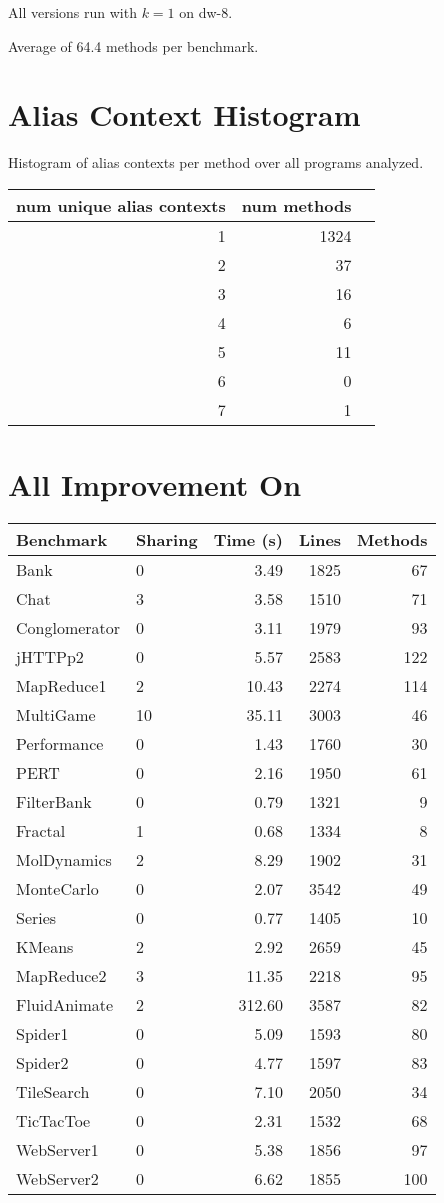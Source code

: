 \documentclass{article}
\begin{document}
All versions run with $k=1$ on dw-8.

Average of 64.4 methods per benchmark.


\section{Alias Context Histogram}
Histogram of alias contexts per method over all programs analyzed.

\begin{tabular}{|r|r|r|}
\hline
num unique alias contexts & num methods \\
\hline
1 & 1324 \\
2 & 37   \\
3 & 16   \\
4 & 6    \\
5 & 11   \\
6 & 0    \\
7 & 1    \\
\hline
\end{tabular}


 
\section{All Improvement On}
\begin{tabular}{|l|l|r|r|r|}
\hline
Benchmark & Sharing & Time (s) & Lines & Methods \\
\hline
Bank & 0 & 3.49 & 1825 & 67 \\
Chat & 3 & 3.58 & 1510 & 71 \\
Conglomerator & 0 & 3.11 & 1979 & 93 \\
jHTTPp2 & 0 & 5.57 & 2583 & 122 \\
MapReduce1 & 2 & 10.43 & 2274 & 114 \\
MultiGame & 10 & 35.11 & 3003 & 46 \\
Performance & 0 & 1.43 & 1760 & 30 \\
PERT & 0 & 2.16 & 1950 & 61 \\
FilterBank & 0 & 0.79 & 1321 & 9 \\
Fractal & 1 & 0.68 & 1334 & 8 \\
MolDynamics & 2 & 8.29 & 1902 & 31 \\
MonteCarlo & 0 & 2.07 & 3542 & 49 \\
Series & 0 & 0.77 & 1405 & 10 \\
KMeans & 2 & 2.92 & 2659 & 45 \\
MapReduce2 & 3 & 11.35 & 2218 & 95 \\
FluidAnimate & 2 & 312.60 & 3587 & 82 \\
Spider1 & 0 & 5.09 & 1593 & 80 \\
Spider2 & 0 & 4.77 & 1597 & 83 \\
TileSearch & 0 & 7.10 & 2050 & 34 \\
TicTacToe & 0 & 2.31 & 1532 & 68 \\
WebServer1 & 0 & 5.38 & 1856 & 97 \\
WebServer2 & 0 & 6.62 & 1855 & 100 \\
\hline
\end{tabular}
\end{document}
